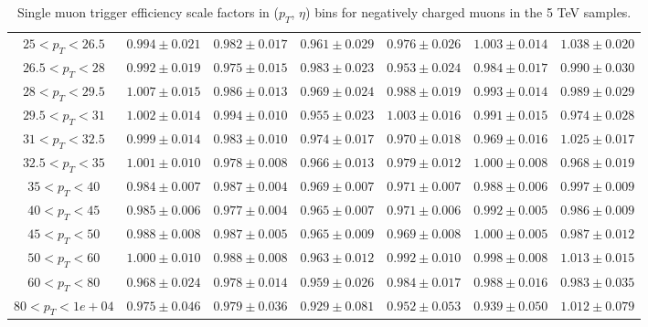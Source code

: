 \begin{table}
\begin{center}
{\begin{tabular}{ccccccc}
\hline \hline
$25<p_{T}<26.5$ & $0.994 \pm 0.021$ & $0.982 \pm 0.017$ & $0.961 \pm 0.029$ & $0.976 \pm 0.026$ & $1.003 \pm 0.014$ & $1.038 \pm 0.020$  \\
$26.5<p_{T}<28$ & $0.992 \pm 0.019$ & $0.975 \pm 0.015$ & $0.983 \pm 0.023$ & $0.953 \pm 0.024$ & $0.984 \pm 0.017$ & $0.990 \pm 0.030$  \\
$28<p_{T}<29.5$ & $1.007 \pm 0.015$ & $0.986 \pm 0.013$ & $0.969 \pm 0.024$ & $0.988 \pm 0.019$ & $0.993 \pm 0.014$ & $0.989 \pm 0.029$  \\
$29.5<p_{T}<31$ & $1.002 \pm 0.014$ & $0.994 \pm 0.010$ & $0.955 \pm 0.023$ & $1.003 \pm 0.016$ & $0.991 \pm 0.015$ & $0.974 \pm 0.028$  \\
$31<p_{T}<32.5$ & $0.999 \pm 0.014$ & $0.983 \pm 0.010$ & $0.974 \pm 0.017$ & $0.970 \pm 0.018$ & $0.969 \pm 0.016$ & $1.025 \pm 0.017$  \\
$32.5<p_{T}<35$ & $1.001 \pm 0.010$ & $0.978 \pm 0.008$ & $0.966 \pm 0.013$ & $0.979 \pm 0.012$ & $1.000 \pm 0.008$ & $0.968 \pm 0.019$  \\
$35<p_{T}<40$ & $0.984 \pm 0.007$ & $0.987 \pm 0.004$ & $0.969 \pm 0.007$ & $0.971 \pm 0.007$ & $0.988 \pm 0.006$ & $0.997 \pm 0.009$  \\
$40<p_{T}<45$ & $0.985 \pm 0.006$ & $0.977 \pm 0.004$ & $0.965 \pm 0.007$ & $0.971 \pm 0.006$ & $0.992 \pm 0.005$ & $0.986 \pm 0.009$  \\
$45<p_{T}<50$ & $0.988 \pm 0.008$ & $0.987 \pm 0.005$ & $0.965 \pm 0.009$ & $0.969 \pm 0.008$ & $1.000 \pm 0.005$ & $0.987 \pm 0.012$  \\
$50<p_{T}<60$ & $1.000 \pm 0.010$ & $0.988 \pm 0.008$ & $0.963 \pm 0.012$ & $0.992 \pm 0.010$ & $0.998 \pm 0.008$ & $1.013 \pm 0.015$  \\
$60<p_{T}<80$ & $0.968 \pm 0.024$ & $0.978 \pm 0.014$ & $0.959 \pm 0.026$ & $0.984 \pm 0.017$ & $0.988 \pm 0.016$ & $0.983 \pm 0.035$  \\
$80<p_{T}<1e+04$ & $0.975 \pm 0.046$ & $0.979 \pm 0.036$ & $0.929 \pm 0.081$ & $0.952 \pm 0.053$ & $0.939 \pm 0.050$ & $1.012 \pm 0.079$  \\
\hline
\end{tabular}}
\end{center}
\caption{Single muon trigger efficiency scale factors in ($p_T$, $\eta$) bins for negatively charged muons in the 5 TeV samples.}
\label{tab:Eff:mu:5TeV:HLT:neg}
\end{table}
